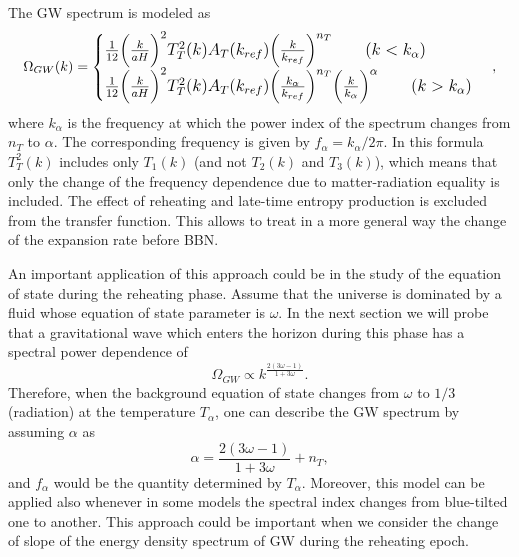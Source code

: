 \documentclass[11pt,a4paper,twoside]{book}
\begin{document}
The GW spectrum is modeled as 
\
\begin{equation}
	\large
		\label{Chap3:GWExtension}
	\Omega_{GW}(k) = 
	\begin{cases}
		\frac{1}{12}\Big ( \frac{k}{aH} \Big)^{2} T_{T}^{2}(k)A_{T}(k_{ref})\Big (\frac{k}{k_{ref}}\Big)^{n_{T}} \qquad  (k<k_{\alpha})\\		
		\frac{1}{12}\Big (\frac{k}{aH} \Big)^{2} T_{T}^{2}(k)A_{T}(k_{ref})\Big (\frac{k_{\alpha}}{k_{ref}}\Big)^{n_{T}}\Big (\frac{k}{k_{\alpha}}\Big)^{\alpha} \qquad  (k>k_{\alpha})
	\end{cases},
\end{equation}
where $ k_{\alpha} $ is the frequency at which the power index of the spectrum changes from $ n_{T}  $ to $\alpha$. The corresponding frequency is given by $ f_{\alpha}=k_{\alpha}/2\pi $. In this formula $ T_{T}^{2}(k) $ includes only $ T_{1}(k) $ (and not $ T_{2}(k) $ and $ T_{3}(k) $), which means  that only the change of the frequency dependence due to matter-radiation equality is included. The effect of reheating and late-time entropy production is excluded from the transfer function. This allows to treat in a more general way the change of the expansion rate before BBN.

An important application of this approach could be in the study of the equation of state during the reheating phase. Assume that the universe is dominated by a fluid whose equation of state parameter is $ \omega $. In the next section we will probe that a gravitational wave which enters the horizon during this phase has a spectral power dependence of
\begin{equation}
	\label{Chap3:OmegaEquationOfState}
	\Omega_{GW} \propto k^{\frac{2(3\omega - 1)}{1+3\omega}}.
\end{equation}
Therefore, when the background equation of state changes from $ \omega $ to $ 1/3 $ (radiation) at the temperature $ T_{\alpha} $, one can describe the GW spectrum by assuming $\alpha$ as 
\begin{equation}
\label{Chap3:dependence}
\alpha = \frac{2(3\omega-1)}{1+3\omega}	+ n_{T},
\end{equation}
and $ f_{\alpha} $ would be the quantity determined by $ T_{\alpha} $.
Moreover, this model can be applied also whenever in some models the spectral index changes from blue-tilted one to another.
This approach could be important when we consider the change of slope of the energy density spectrum of GW during the reheating epoch.
\end{document}
